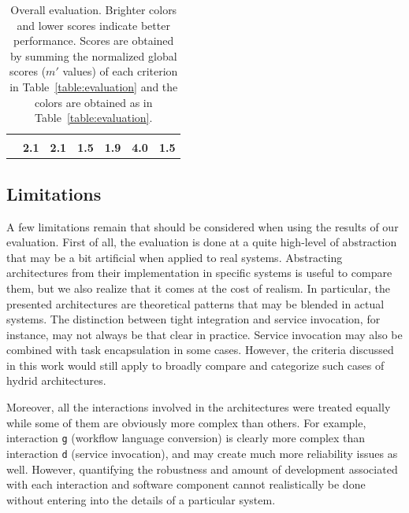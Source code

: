\documentclass[preprint,3p,twocolumn]{elsarticle}
\begin{document}
\begin{table}
\begin{tabular}{rcccccc}
                                     & \cellcolor[HTML]{99CC99}{0.50}
                                     & \cellcolor[HTML]{99FF99}{0.00}\\
                                    & \cellcolor[HTML]{99E799}\textbf{2.1}
                                    & \cellcolor[HTML]{99E699}\textbf{2.1}
                                    & \cellcolor[HTML]{99FE99}\textbf{1.5}
                                    & \cellcolor[HTML]{99EF99}\textbf{1.9}
                                    & \cellcolor[HTML]{999999}\textbf{4.0}
                                    & \cellcolor[HTML]{99FF99}\textbf{1.5}\\
\end{tabular}
\caption{Overall evaluation. Brighter colors and lower scores indicate better performance. Scores
  are obtained by summing the normalized global scores ($m'$ values) of
  each criterion in Table~\ref{table:evaluation} and the colors are obtained as in Table~\ref{table:evaluation}. }
\label{table:overall}
\end{table}

\subsection{Limitations}

A few limitations remain that should be considered when using the
results of our evaluation. First of all, the evaluation is done at a
quite high-level of abstraction that may be a bit artificial when
applied to real systems. Abstracting architectures from their
implementation in specific systems is useful to compare them, but we
also realize that it comes at the cost of realism. In particular, the
presented architectures are theoretical patterns that may be blended
in actual systems. The distinction between tight integration and
service invocation, for instance, may not always be that clear in
practice. Service invocation may also be combined with task
encapsulation in some cases. However, the criteria discussed in this
work would still apply to broadly compare and categorize such cases of
hydrid architectures.

Moreover, all the interactions involved in the architectures were
treated equally while some of them are obviously more complex
than others. For example, interaction \texttt{g} (workflow language
conversion) is clearly more complex than interaction \texttt{d}
(service invocation), and may create much more reliability issues as
well. However, quantifying the robustness and amount of development
associated with each interaction and software component cannot
realistically be done without entering into the details of a
particular system.
\end{document}
